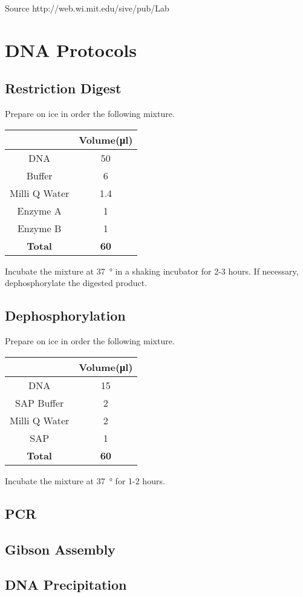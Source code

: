 Source http://web.wi.mit.edu/sive/pub/Lab%


\section{DNA Protocols}
\subsection{Restriction Digest}
Prepare on ice in order the following mixture.


\begin{center}
\begin{tabular}{c|c}
				&	\textbf{Volume(\si{\micro\litre})} 	\\\hline
DNA				&	50									\\
Buffer			&	6									\\
Milli Q Water	&	1.4									\\
Enzyme A			&	1									\\
Enzyme B			&	1									\\\hline
\textbf{Total}	&	\textbf{60}					
\end{tabular}
\end{center}

Incubate the mixture at \SI{37}{\degree} in a shaking incubator for 2-3 hours.
If necessary, dephosphorylate the digested product.

\subsection{Dephosphorylation}
Prepare on ice in order the following mixture.

\begin{center}
\begin{tabular}{c|c}
				&	\textbf{Volume(\si{\micro\litre})} 	\\\hline
DNA				&	15									\\
SAP Buffer		&	2									\\
Milli Q Water	&	2									\\
SAP				&	1									\\\hline
\textbf{Total}	&	\textbf{60}					
\end{tabular}
\end{center}

Incubate the mixture at \SI{37}{\degree} for 1-2 hours.

\subsection{PCR}

\subsection{Gibson Assembly}


\subsection{DNA Precipitation}
